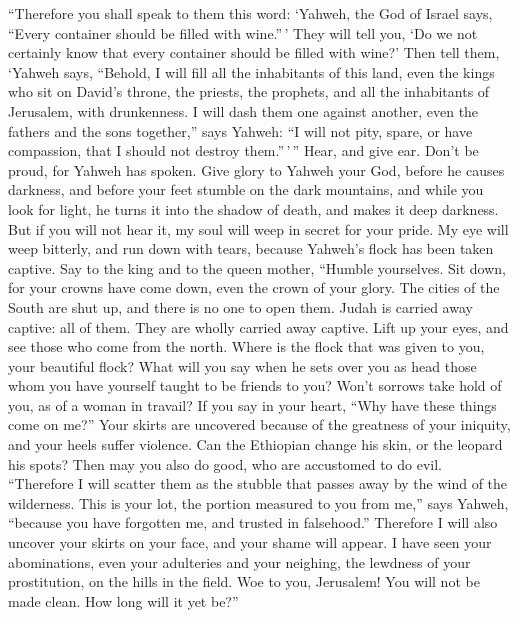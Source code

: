  ``Therefore you shall speak to them this word: `Yahweh,
the God of Israel says, ``Every container should be filled with
wine.''\,' They will tell you, `Do we not certainly know that every
container should be filled with wine?'  Then tell them,
`Yahweh says, ``Behold, I will fill all the inhabitants of this land,
even the kings who sit on David's throne, the priests, the prophets, and
all the inhabitants of Jerusalem, with drunkenness.  I
will dash them one against another, even the fathers and the sons
together,'' says Yahweh: ``I will not pity, spare, or have compassion,
that I should not destroy them.''\,'\,''  Hear, and give
ear. Don't be proud, for Yahweh has spoken.  Give glory
to Yahweh your God, before he causes darkness, and before your feet
stumble on the dark mountains, and while you look for light, he turns it
into the shadow of death, and makes it deep darkness. 
But if you will not hear it, my soul will weep in secret for your pride.
My eye will weep bitterly, and run down with tears, because Yahweh's
flock has been taken captive.  Say to the king and to the
queen mother, ``Humble yourselves. Sit down, for your crowns have come
down, even the crown of your glory.  The cities of the
South are shut up, and there is no one to open them. Judah is carried
away captive: all of them. They are wholly carried away captive.
 Lift up your eyes, and see those who come from the
north. Where is the flock that was given to you, your beautiful flock?
 What will you say when he sets over you as head those
whom you have yourself taught to be friends to you? Won't sorrows take
hold of you, as of a woman in travail?  If you say in
your heart, ``Why have these things come on me?'' Your skirts are
uncovered because of the greatness of your iniquity, and your heels
suffer violence.  Can the Ethiopian change his skin, or
the leopard his spots? Then may you also do good, who are accustomed to
do evil.  ``Therefore I will scatter them as the stubble
that passes away by the wind of the wilderness.  This is
your lot, the portion measured to you from me,'' says Yahweh, ``because
you have forgotten me, and trusted in falsehood.'' 
Therefore I will also uncover your skirts on your face, and your shame
will appear.  I have seen your abominations, even your
adulteries and your neighing, the lewdness of your prostitution, on the
hills in the field. Woe to you, Jerusalem! You will not be made clean.
How long will it yet be?''

